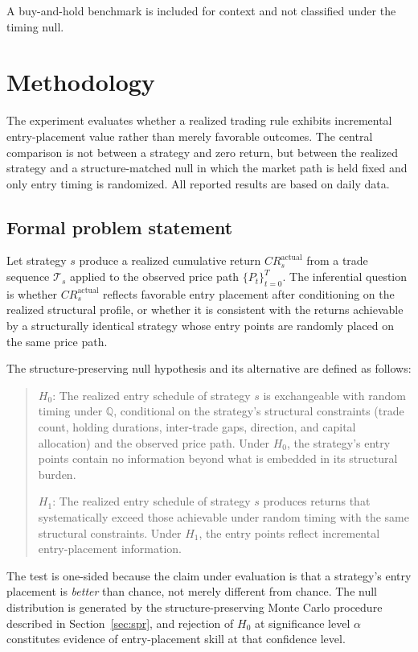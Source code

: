 \documentclass[preprint,12pt]{elsarticle}
\theoremstyle{definition}
\begin{document}
A buy-and-hold benchmark is included for context and not classified under the timing null.

\section{Methodology}

The experiment evaluates whether a realized trading rule exhibits incremental entry-placement value rather than merely favorable outcomes. The central comparison is not between a strategy and zero return, but between the realized strategy and a structure-matched null in which the market path is held fixed and only entry timing is randomized. All reported results are based on daily data.

\subsection{Formal problem statement}

Let strategy $s$ produce a realized cumulative return $CR_s^{\mathrm{actual}}$ from a trade sequence $\mathcal{T}_s$ applied to the observed price path $\{P_t\}_{t=0}^{T}$. The inferential question is whether $CR_s^{\mathrm{actual}}$ reflects favorable entry placement after conditioning on the realized structural profile, or whether it is consistent with the returns achievable by a structurally identical strategy whose entry points are randomly placed on the same price path.

The structure-preserving null hypothesis and its alternative are defined as follows:
\begin{quote}
$H_0$: The realized entry schedule of strategy $s$ is exchangeable with random timing under $\mathbb{Q}$, conditional on the strategy's structural constraints (trade count, holding durations, inter-trade gaps, direction, and capital allocation) and the observed price path. Under $H_0$, the strategy's entry points contain no information beyond what is embedded in its structural burden.

\medskip

$H_1$: The realized entry schedule of strategy $s$ produces returns that systematically exceed those achievable under random timing with the same structural constraints. Under $H_1$, the entry points reflect incremental entry-placement information.
\end{quote}

The test is one-sided because the claim under evaluation is that a strategy's entry placement is \emph{better} than chance, not merely different from chance. The null distribution is generated by the structure-preserving Monte Carlo procedure described in Section~\ref{sec:spr}, and rejection of $H_0$ at significance level $\alpha$ constitutes evidence of entry-placement skill at that confidence level.
\end{document}

